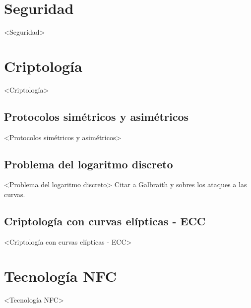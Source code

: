 \documentclass[../PFC.tex]{subfiles}
\begin{document}
\section{Seguridad}
\label{Seguridad}

<Seguridad>

\section{Criptología}
\label{Criptología}

<Criptología>

\subsection{Protocolos simétricos y asimétricos}
\label{Protocolos simétricos y asimétricos}

<Protocolos simétricos y asimétricos>

\subsection{Problema del logaritmo discreto}
\label{Problema del logaritmo discreto}

<Problema del logaritmo discreto>
Citar a Galbraith y sobres los ataques a las curvas.

\subsection{Criptología con curvas elípticas - ECC}
\label{Criptología con curvas elípticas - ECC}

<Criptología con curvas elípticas - ECC>

\section{Tecnología NFC}
\label{Tecnología NFC}

<Tecnología NFC>
\end{document}
